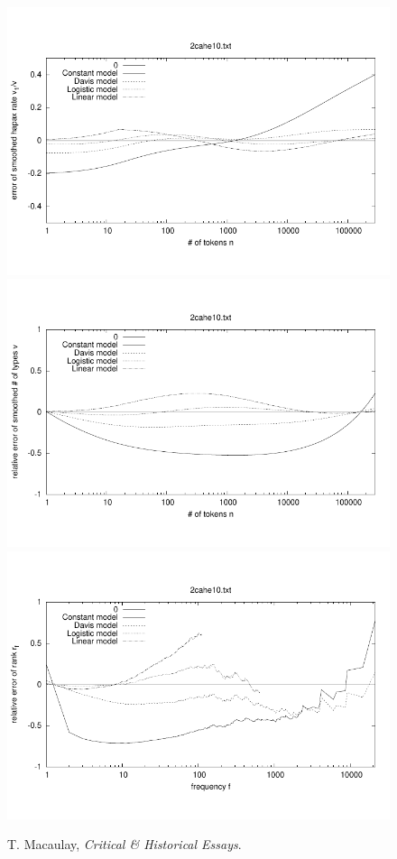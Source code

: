 \documentclass[a4paper,12pt]{article}
\begin{document}
\begin{figure}[p]
  \centering
  \vspace{-2em}
  \includegraphics[width=0.8\columnwidth]{output/herdan/2cahe10_27/token_ratio_residual.pdf}
  \\[-3em]
  \includegraphics[width=0.8\columnwidth]{output/herdan/2cahe10_27/token_residual.pdf}
  \\[-3em]
  \includegraphics[width=0.8\columnwidth]{output/herdan/2cahe10_27/frequency_residual.pdf}
  \vspace{-2em}
  \caption{T. Macaulay, \emph{Critical \& Historical
      Essays}.\label{fig2cahe10R}}
\end{figure}
\end{document}
